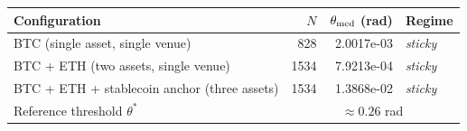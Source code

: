 \begin{tabular}{@{}lrrl@{}}
\toprule
Configuration & $N$ & $\theta_{\rm med}$ (rad) & Regime \\
\midrule
BTC (single asset, single venue) & 828 & 2.0017e-03 & \emph{sticky} \\
BTC + ETH (two assets, single venue) & 1534 & 7.9213e-04 & \emph{sticky} \\
BTC + ETH + stablecoin anchor (three assets) & 1534 & 1.3868e-02 & \emph{sticky} \\
\midrule
Reference threshold $\theta^{*}$ & \multicolumn{3}{c}{$\approx 0.26$ rad} \\
\bottomrule
\end{tabular}